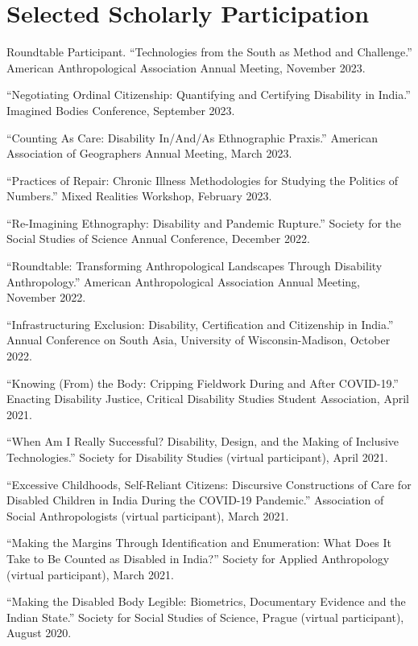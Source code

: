 \documentclass[11pt,letterpaper]{report}
\newcommand{\listitemspace}{0.25em}
\renewenvironment{itemize}{\begin{list}{}{\setlength{\leftmargin}{0em}\setlength{\parskip}{0em}\setlength{\itemsep}{\listitemspace}\setlength{\parsep}{\listitemspace}}}{\end{list}}
\begin{document}
    \section*{Selected Scholarly Participation}
    \begin{itemize}
        \item Roundtable Participant. “Technologies from the South as Method and Challenge.” American Anthropological Association Annual Meeting, November 2023.
        \item “Negotiating Ordinal Citizenship: Quantifying and Certifying Disability in India.” Imagined Bodies Conference, September 2023.
        \item “Counting As Care: Disability In/And/As Ethnographic Praxis.” American Association of Geographers Annual Meeting, March 2023.
        \item “Practices of Repair: Chronic Illness Methodologies for Studying the Politics of Numbers.” Mixed Realities Workshop, February 2023.
        \item “Re-Imagining Ethnography: Disability and Pandemic Rupture.” Society for the Social Studies of Science Annual Conference, December 2022.
        \item “Roundtable: Transforming Anthropological Landscapes Through Disability Anthropology.” American Anthropological Association Annual Meeting, November 2022.
        \item “Infrastructuring Exclusion: Disability, Certification and Citizenship in India.” Annual Conference on South Asia, University of Wisconsin-Madison, October 2022.
        \item “Knowing (From) the Body: Cripping Fieldwork During and After COVID-19.” Enacting Disability Justice, Critical Disability Studies Student Association, April 2021.
        \item “When Am I Really Successful? Disability, Design, and the Making of Inclusive Technologies.” Society for Disability Studies (virtual participant), April 2021.
        \item “Excessive Childhoods, Self-Reliant Citizens: Discursive Constructions of Care for Disabled Children in India During the COVID-19 Pandemic.” Association of Social Anthropologists (virtual participant), March 2021.
        \item “Making the Margins Through Identification and Enumeration: What Does It Take to Be Counted as Disabled in India?” Society for Applied Anthropology (virtual participant), March 2021.
        \item “Making the Disabled Body Legible: Biometrics, Documentary Evidence and the Indian State.” Society for Social Studies of Science, Prague (virtual participant), August 2020.

\end{itemize}
\end{document}
